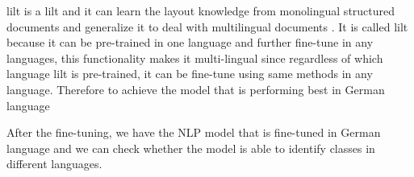 \acrshort{lilt} is a \acrlong{lilt} and it can learn the layout knowledge from monolingual structured documents and generalize it to deal with multilingual documents \cite{wang-etal-2022-lilt}. It is called \acrlong{lilt} because it can be pre-trained in one language and further fine-tune in any languages, this functionality makes it multi-lingual since regardless of which language \acrshort{lilt} is pre-trained, it can be fine-tune using same methods in any language. Therefore to achieve the model that is performing best in German language

After the fine-tuning, we have the NLP model that is fine-tuned in German language and we can check whether the model is able to identify classes in different languages. 

